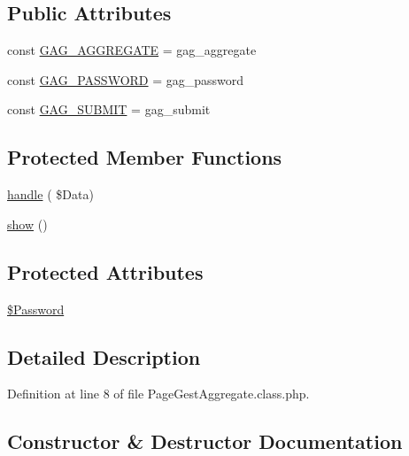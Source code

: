\subsection*{Public Attributes}
\begin{DoxyCompactItemize}
\item 
const \hyperlink{class_page_gest_aggregate_a2a53000f9232b52cecdab452d2abb1d5}{G\+A\+G\+\_\+\+A\+G\+G\+R\+E\+G\+A\+TE} = \textquotesingle{}gag\+\_\+aggregate\textquotesingle{}
\item 
const \hyperlink{class_page_gest_aggregate_a65dc3b1822bf5b079d885daf618eb49e}{G\+A\+G\+\_\+\+P\+A\+S\+S\+W\+O\+RD} = \textquotesingle{}gag\+\_\+password\textquotesingle{}
\item 
const \hyperlink{class_page_gest_aggregate_a21f33cbbd9928bc6ebc371d61ebe995d}{G\+A\+G\+\_\+\+S\+U\+B\+M\+IT} = \textquotesingle{}gag\+\_\+submit\textquotesingle{}
\end{DoxyCompactItemize}
\subsection*{Protected Member Functions}
\begin{DoxyCompactItemize}
\item 
\hyperlink{class_page_gest_aggregate_a9c4a2d111c979d9257b01312b73fd508}{handle} ( \$Data)
\item 
\hyperlink{class_page_gest_aggregate_ae270b8be8cd1651c4ef69d02ee4297e4}{show} ()
\end{DoxyCompactItemize}
\subsection*{Protected Attributes}
\begin{DoxyCompactItemize}
\item 
\hyperlink{class_page_gest_aggregate_ae76cfdf16ff591c914a85887517c0ef0}{\$\+Password}
\end{DoxyCompactItemize}


\subsection{Detailed Description}


Definition at line 8 of file Page\+Gest\+Aggregate.\+class.\+php.



\subsection{Constructor \& Destructor Documentation}
\mbox{\label{class_page_gest_aggregate_ac15507e70d0de1f85e2130d04a9dc331}} 

